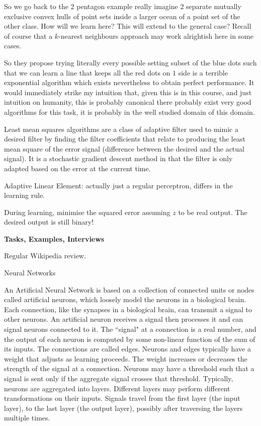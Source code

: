 So we go back to the $2$ pentagon example really imagine $2$ separate mutually exclusive convex hulls of point sets inside a larger ocean of a point set of the other class. How will we learn here? This will extend to the general case? Recall of course that a $k$-nearest neighbours approach may work alrightish here in some cases.

So they propose trying literally every possible setting subset of the blue dots such that we can learn a line that keeps all the red dots on $1$ side is a terrible exponential algorithm which exists nevertheless to obtain perfect performance. It would immediately strike my intuition that, given this is in this course, and just intuition on humanity, this is probably canonical there probably exist very good algorithms for this task, it is probably in the well studied domain of this domain.

Least mean squares algorithms are a class of adaptive filter used to mimic a desired filter by finding the filter coefficients that relate to producing the least mean square of the error signal (difference between the desired and the actual signal). It is a stochastic gradient descent method in that the filter is only adapted based on the error at the current time.

Adaptive Linear Element: actually just a regular perceptron, differs in the learning rule.

During learning, minimise the squared error assuming $z$ to be real output. The desired output is still binary!

\newpage

\textbf{Tasks, Examples, Interviews}

Regular Wikipedia review.

Neural Networks

An Artificial Neural Network is based on a collection of connected units or nodes called artificial neurons, which loosely model the neurons in a biological brain. Each connection, like the synapses in a biological brain, can transmit a signal to other neurons. An artificial neuron receives a signal then processes it and can signal neurons connected to it. The ``signal" at a connection is a real number, and the output of each neuron is computed by some non-linear function of the sum of its inputs. The connections are called edges. Neurons and edges typically have a weight that adjusts as learning proceeds. The weight increases or decreases the strength of the signal at a connection. Neurons may have a threshold such that a signal is sent only if the aggregate signal crosses that threshold. Typically, neurons are aggregated into layers. Different layers may perform different transformations on their inputs. Signals travel from the first layer (the input layer), to the last layer (the output layer), possibly after traversing the layers multiple times.


